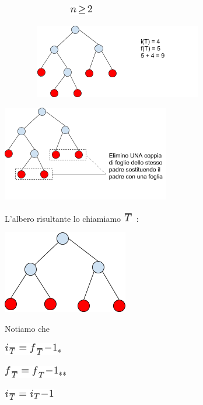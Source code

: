 \documentclass{article}
\begin{document}
{~~~~~~~~~~~~~~~~}\includegraphics{images/image43.png}

{~~~~~~~~}{\includegraphics{images/image525.png}}

{\includegraphics{images/image536.png}}

{L'albero risultante lo chiamiamo
}\includegraphics{images/image44.png}{~:}

{\includegraphics{images/image522.png}}

{}

{Notiamo che }

\includegraphics{images/image45.png}{*}

{}

\includegraphics{images/image46.png}{**}

\includegraphics{images/image47.png}{~ ~}
\end{document}
